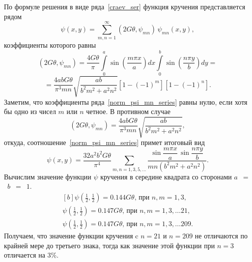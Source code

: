 \documentclass[12pt, a4paper]{article}
\begin{document}
По формуле решения в виде ряда~\eqref{craev_ser} функция кручения представляется рядом
\begin{equation}  \label{norm_psi_mn_series}
	\psi(x, y) = \sum_{m, n = 1}^\infty (2G \theta, \psi_{mn}) \, \psi_{mn}(x, y),
\end{equation}
коэффициенты которого равны
\[
(2G \theta, \psi_{mn}) = \frac{4 G \theta}{\pi}\int\limits_0^a \sin\left(\frac{m \pi x}{a}\right) dx \int\limits_0^b
\sin\left(\frac{n \pi y}{b}\right) dy = 
\]
\[
	= \frac{4abG\theta}{\pi^3 mn} \sqrt{\frac{ab}{b^2 m^2 + a^2 n^2}}[1 - (-1)^m][1 - (-1)^n].
\]
Заметим, что коэффициенты ряда~\eqref{norm_psi_mn_series} равны нулю, если
хотя бы одно из чисел $m$ или $n$ четное. В противном случае
\[
(2G \theta, \psi_{mn}) = \frac{4abG\theta}{\pi^3 mn} \sqrt{\frac{ab}{b^2 m^2 + a^2 n^2}},
\]
откуда, соотношение~\eqref{norm_psi_mn_series} примет итоговый вид
\begin{equation} 
	\label{energy_ans}
	\psi(x, y) = \frac{32 a^2 b^2 G\theta}{\pi^4} \!\!\! \sum_{m, n = 1, 3, 5, \ldots}
	\!\!\! \frac{\sin\dfrac{m\pi x}{a} \, \sin\dfrac{n\pi y}{b}}{mn(b^2 m^2 + a^2 n^2)}.
\end{equation}
Вычислим значение функции $\psi$ кручения в середине квадрата со сторонами $a$~$=$~$b$~$=$~$1$.
\begin{equation} 
	\label{psi_energy_middle}
	\begin{aligned}[b]
	\psi\left(\frac{1}{2}, \frac{1}{2}\right) = 0.144G\theta\mbox{, при } n, m = 1, 3, \\
	\psi\left(\frac{1}{2}, \frac{1}{2}\right) = 0.147G\theta\mbox{, при } n, m = 1, 3, \ldots21,\\
	\psi\left(\frac{1}{2}, \frac{1}{2}\right) = 0.147G\theta\mbox{, при } n, m = 1, 3, \ldots209.
	\end{aligned}
\end{equation}
Получаем, что значение функции кручения c $n = 21$ и $n = 209$ не отличаются по крайней мере до третьего знака, тогда как значение этой функции при $n = 3$ отличается на 3\%.
\end{document}
